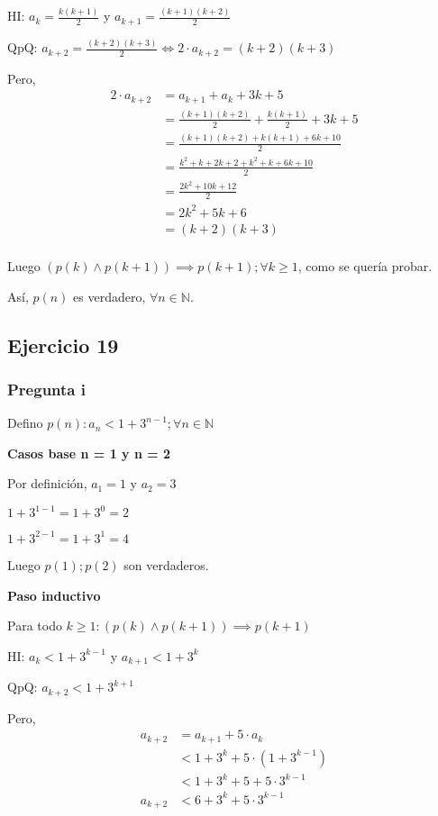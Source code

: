 HI: $ a_k = \frac{k(k+1)}{2} $ y $ a_{k+1} = \frac{(k+1)(k+2)}{2} $

QpQ: $ a_{k+2} = \frac{(k+2)(k+3)}{2} \iff 2\cdot a_{k+2} = (k+2)(k+3) $

Pero,
\begin{align*}
    2\cdot a_{k+2} &= a_{k+1} + a_k + 3k + 5 \\
    &= \frac{(k+1)(k+2)}{2} + \frac{k(k+1)}{2} + 3k + 5 \\
    &= \frac{(k+1)(k+2) + k(k+1) + 6k + 10}{2}\\
    &= \frac{k^2 + k + 2k + 2 + k^2 + k + 6k + 10}{2}\\
    &= \frac{2k^2 + 10k + 12}{2}\\
    &= 2k^2 + 5k + 6\\
    &= (k+2)(k+3)\\
\end{align*}

Luego $(p(k) \wedge p(k+1)) \implies p(k+1); \forall k \geq 1$, como se quería probar.

Así, $p(n)$ es verdadero, $\forall n \in \mathbb{N}$.

\subsection{Ejercicio 19}

\subsubsection{Pregunta i}

Defino $ p(n): a_n < 1 + 3^{n-1}; \forall n \in \mathbb{N}$

\textbf{Casos base n = 1 y n = 2}

Por definición, $a_1 = 1$ y $a_2 = 3$

$ 1 + 3^{1-1} = 1 + 3^0 = 2$

$ 1 + 3^{2-1} = 1 + 3^1 = 4$

Luego $ p(1); p(2) $ son verdaderos.

\textbf{Paso inductivo}

Para todo $k \geq 1: (p(k) \wedge p(k+1)) \implies p(k+1)$

HI: $ a_k < 1 + 3^{k-1} $ y $ a_{k+1} < 1 + 3^k $

QpQ: $ a_{k+2} < 1 + 3^{k+1} $

Pero,
\begin{align*}
    a_{k+2} &= a_{k+1} + 5\cdot a_k \\
    &< 1 + 3^k + 5\cdot (1 + 3^{k-1}) \\
    &< 1 + 3^k + 5 + 5\cdot 3^{k-1} \\
    a_{k+2} &< 6 + 3^k + 5\cdot 3^{k-1} \\
\end{align*}

